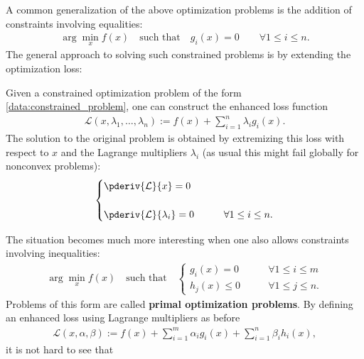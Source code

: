     A common generalization of the above optimization problems is the addition of constraints involving equalities:
    \begin{gather}
        \label{data:constrained_problem}
        \arg\min_x f(x)\quad\text{such that}\quad g_i(x)=0\qquad\forall 1\leq i\leq n.
    \end{gather}
    The general approach to solving such constrained problems is by extending the optimization loss:
    \begin{method}
        Given a constrained optimization problem of the form \eqref{data:constrained_problem}, one can construct the enhanced loss function
        \begin{gather}
            \mathcal{L}(x, \lambda_1,\ldots,\lambda_n) := f(x) + \sum_{i=1}^n\lambda_ig_i(x).
        \end{gather}
        The solution to the original problem is obtained by extremizing this loss with respect to $x$ and the Lagrange multipliers $\lambda_i$ (as usual this might fail globally for nonconvex problems):
        \begin{gather}
            \begin{cases}
                \pderiv{\mathcal{L}}{x} = 0\\\\
                \pderiv{\mathcal{L}}{\lambda_i} = 0&\qquad\forall1\leq i\leq n.
            \end{cases}
        \end{gather}
    \end{method}
    The situation becomes much more interesting when one also allows constraints involving inequalities:
    \begin{gather}
        \label{data:constrained_optimization}
        \arg\min_x f(x)\quad\text{such that}\quad
        \begin{cases}
            g_i(x)=0&\qquad\forall 1\leq i\leq m\\
            h_j(x)\leq0&\qquad\forall 1\leq j\leq n.
        \end{cases}
    \end{gather}
    Problems of this form are called \textbf{primal optimization problems}. By defining an enhanced loss using Lagrange multipliers as before
    \begin{gather}
        \mathcal{L}(x,\alpha,\beta) := f(x) + \sum_{i=1}^m\alpha_ig_i(x) + \sum_{i=1}^n\beta_ih_i(x),
    \end{gather}
    it is not hard to see that
